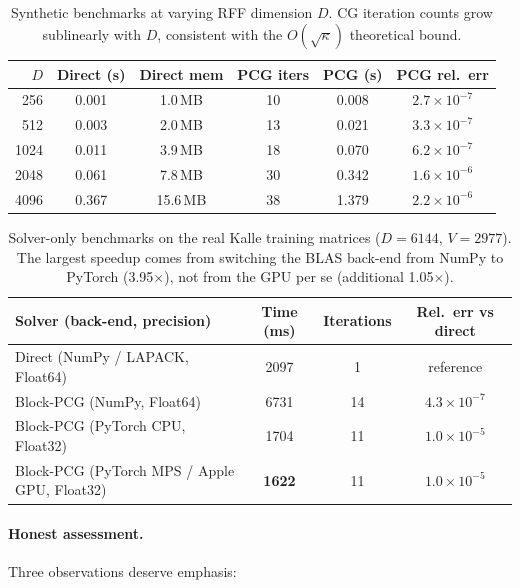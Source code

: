 \documentclass[11pt,a4paper]{article}
\begin{document}
\begin{table}[h]
\centering\small
\begin{tabular}{@{}rccccc@{}}
\toprule
$D$ & Direct (s) & Direct mem & PCG iters & PCG (s) & PCG rel.\ err \\
\midrule
 256  & 0.001 & 1.0\,MB  & 10 & 0.008 & $2.7 \times 10^{-7}$ \\
 512  & 0.003 & 2.0\,MB  & 13 & 0.021 & $3.3 \times 10^{-7}$ \\
1024  & 0.011 & 3.9\,MB  & 18 & 0.070 & $6.2 \times 10^{-7}$ \\
2048  & 0.061 & 7.8\,MB  & 30 & 0.342 & $1.6 \times 10^{-6}$ \\
4096  & 0.367 & 15.6\,MB & 38 & 1.379 & $2.2 \times 10^{-6}$ \\
\bottomrule
\end{tabular}
\caption{Synthetic benchmarks at varying RFF dimension $D$. CG iteration counts grow sublinearly with $D$, consistent with the $O(\sqrt{\kappa})$ theoretical bound.}
\label{tab:benchmarks-synth}
\end{table}

\begin{table}[h]
\centering\small
\begin{tabular}{@{}lccc@{}}
\toprule
Solver (back-end, precision) & Time (ms) & Iterations & Rel.\ err vs direct \\
\midrule
Direct (NumPy / LAPACK, Float64) & 2097 & 1 & reference \\
Block-PCG (NumPy, Float64)       & 6731 & 14 & $4.3 \times 10^{-7}$ \\
Block-PCG (PyTorch CPU, Float32) & 1704 & 11 & $1.0 \times 10^{-5}$ \\
Block-PCG (PyTorch MPS / Apple GPU, Float32) & \textbf{1622} & 11 & $1.0 \times 10^{-5}$ \\
\bottomrule
\end{tabular}
\caption{Solver-only benchmarks on the real Kalle training matrices ($D = 6144$, $V = 2977$). The largest speedup comes from switching the BLAS back-end from NumPy to PyTorch (3.95$\times$), not from the GPU per se (additional 1.05$\times$).}
\label{tab:benchmarks-real}
\end{table}

\paragraph{Honest assessment.} Three observations deserve emphasis:
\end{document}
